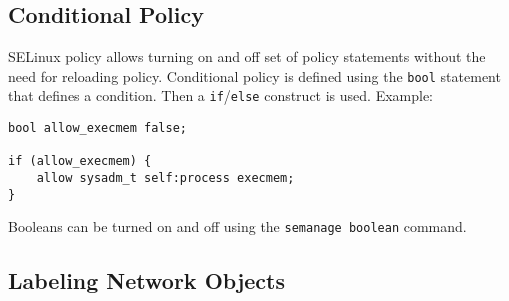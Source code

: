 \subsection{Conditional Policy}

SELinux policy allows turning on and off set of policy statements without the
need for reloading policy. Conditional policy is defined using the \texttt{bool}
statement that defines a condition. Then a \texttt{if}/\texttt{else} construct
is used. Example:
\begin{lstlisting}
bool allow_execmem false;

if (allow_execmem) {
    allow sysadm_t self:process execmem;
}
\end{lstlisting}
Booleans can be turned on and off using the \texttt{semanage boolean} command.

\subsection{Labeling Network Objects}

